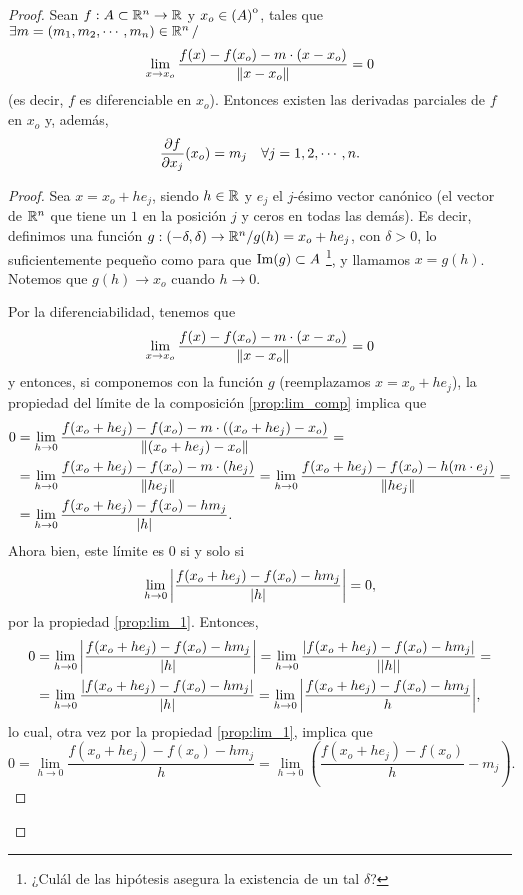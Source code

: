 \begin{theorem}
\begin{proof}
\iffalse
Entonces, por la propiedad \eqref{prop:lim_2}, tenemos que
\[
 \lim_{h \to 0} \frac{ f(x_o + h,y_o) - f(x_o,y_o) }{h} = \alpha,
\]
\fi
Sean $f: A \subset \mathbb{R}^n \to \mathbb{R}$ y $x_o \in {\kern0pt(A)}^{\mathrm{o}}$, tales que $\exists m = (m_1, m_2, \cdots, m_n) \in \mathbb{R}^n \, /$
\[
 \lim_{x \to x_o} \frac{f(x) - f(x_o) - m \cdot (x - x_o)}
                                 {\norm{x - x_o}} = 0
\]
(es decir, $f$ es diferenciable en $x_o$). Entonces existen las derivadas parciales de $f$ en $x_o$ y, adem\'as,
\[
 \dfrac{\partial f}{\partial x_j} (x_o) = m_j \quad \forall j = 1, 2, \cdots, n.
\]

 \begin{proof}
 \mbox{}
 
Sea $x = x_o + h e_j$, siendo $h \in \mathbb{R}$ y $e_j$ el $j$-\'esimo vector can\'onico (el vector de $\mathbb{R}^n$ que tiene un $1$ en la posici\'on $j$ y ceros en todas las dem\'as). Es decir, definimos una funci\'on $g:(-\delta,\delta) \to \mathbb{R}^n / g(h) = x_o + h e_j$, con $\delta > 0$, lo suficientemente peque\~{n}o como para que $\operatorname{Im}(g) \subset A$ \footnote{¿Cul\'al de las hip\'otesis asegura la existencia de un tal $\delta$?}, y llamamos $x = g(h)$. Notemos que $g(h) \to x_o$ cuando $h \to 0$. 

Por la diferenciabilidad, tenemos que 
\[
 \lim_{x \to x_o} \frac{f(x) - f(x_o) - m \cdot (x - x_o)}
                                 {\norm{x - x_o}} = 0
\]
y entonces, si componemos con la funci\'on $g$ (reemplazamos $x = x_o + h e_j$), la propiedad del l\'imite de la composici\'on \eqref{prop:lim_comp} implica que
\begin{align*}
  0 & = \lim_{h \to 0} \frac{f(x_o + h e_j) - f(x_o) - m \cdot ((x_o + he_j) - x_o)}
                                 {\norm{(x_o + he_j) - x_o}} = \\
    & = \lim_{h \to 0} \frac{f(x_o + h e_j) - f(x_o) - m \cdot (he_j)}{\norm{h e_j}} = \lim_{h \to 0} \frac{f(x_o + h e_j) - f(x_o) - h(m \cdot e_j)}{\norm{h e_j}} =\\
    & = \lim_{h \to 0} \frac{f(x_o + h e_j) - f(x_o) - h m_j}{\abs{h}} .
\end{align*}                                
Ahora bien, este l\'imite es $0$ si y solo si
\[
 \lim_{h \to 0} \abs{ \frac{f(x_o + h e_j) - f(x_o) - h m_j}{\abs{h}} } = 0,
\]
por la propiedad \eqref{prop:lim_1}. Entonces,
\begin{align*}
  0 & = \lim_{h \to 0} \abs{ \frac{f(x_o + h e_j) - f(x_o) - h m_j}{\abs{h}} }
      = \lim_{h \to 0} \frac{\abs{f(x_o + h e_j) - f(x_o) - h m_j}}{\abs{\abs{h}}} = \\
    & = \lim_{h \to 0} \frac{\abs{f(x_o + h e_j) - f(x_o) - h m_j}}{\abs{h}}
      = \lim_{h \to 0} \abs{ \frac{f(x_o + h e_j) - f(x_o) - h m_j}{h} },
\end{align*} 
lo cual, otra vez por la propiedad \eqref{prop:lim_1}, implica que 
\[
 0 = \lim_{h \to 0} \frac{f(x_o + h e_j) - f(x_o) - h m_j}{h} =
     \lim_{h \to 0} \left( \frac{f(x_o + h e_j) - f(x_o)}{h} - m_j \right) .
\]


\end{proof}
\end{proof}
\end{theorem}
